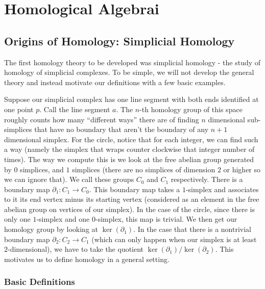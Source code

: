 \chapter{Homological Algebrai}
\section{Origins of Homology: Simplicial Homology}

The first homology theory
to be developed was simplicial homology - the study of homology
of simplicial
complexes. To be simple, we will not develop the general theory
and instead
motivate our definitions with a few basic examples.  

\begin{example} Suppose
our simplicial complex has one line segment with both ends
identified at
one point $p$. Call the line segment $a$. The $n$-th homology
group of this
space roughly counts how many ``different ways'' there are of
finding $n$
dimensional sub-simplices that have no boundary that aren't the
boundary of
any $n+1$ dimensional simplex. For the circle, notice that for
each integer,
we can find such a way (namely the simplex that wraps counter
clockwise that
integer number of times). The way we compute this is we look at
the free abelian group generated by $0$ simplices, and $1$
simplices (there are no simplices of
dimension $2$ or higher so we can ignore that). We call these
groups $C_0$ and
$C_1$ respectively. There is a boundary map $\partial_1:
C_1\rightarrow C_0$.
This boundary map takes a $1$-simplex and associates to it its
end vertex minus
its starting vertex (considered as an element in the free
abelian group on
vertices of our simplex). In the case of the circle, since there
is only one
$1$-simplex and one $0$-simplex, this map is trivial. We then
get our homology
group by looking at $\ker(\partial_1)$. In the case that there
is a nontrivial
boundary map $\partial_2: C_2\rightarrow C_1$ (which can only
happen when our
simplex is at least $2$-dimensional), we have to take the
quotient
$\ker(\partial_1)/\ker(\partial_2)$. This motivates us to define
homology in a
general setting.
\end{example}
\subsection{Basic Definitions}

